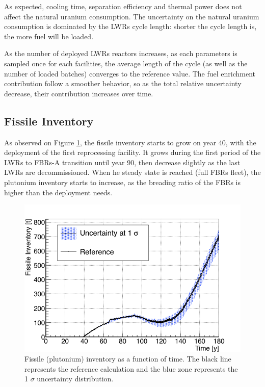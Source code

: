 \documentclass{anstrans}
\begin{document}
As expected, cooling time, separation efficiency and thermal power does not
affect the natural uranium consumption.  The uncertainty on the natural uranium
consumption is dominated by the \glspl{LWR} cycle length: shorter the cycle
length is, the more fuel will be loaded.

As the number of deployed \glspl{LWR} reactors increases, as each parameters is
sampled once for each facilities, the average length of the cycle (as well as
the number of loaded batches) converges to the reference value.
The fuel enrichment contribution follow a smoother behavior, so as the total
relative uncertainty decrease, their contribution increases over time.

\subsection{Fissile Inventory}
As observed on Figure \ref{fig:pu_full}, the fissile inventory starts to grow on
year 40, with the deployment of the first reprocessing facility. It grows
during the first period of the \glspl{LWR} to \glspl{FBR}-A transition until
year 90, then decrease slightly as the last \glspl{LWR} are decommissioned.
When he steady state is reached (full \glspl{FBR} fleet), the plutonium
inventory starts to increase, as the breading ratio of the \glspl{FBR} is higher
than the deployment needs.

\begin{figure}[ht] %
    \centering
    \includegraphics[scale=0.35]{pu_full}
    \caption{Fissile (plutonium) inventory as a function of time. The black line
        represents the reference calculation and the blue zone
        represents the 1 $\sigma$ uncertainty distribution.}\label{fig:pu_full}
\end{figure}
\end{document}
